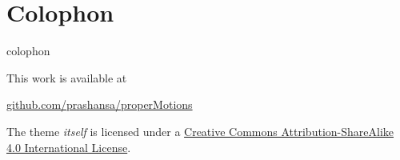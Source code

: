\documentclass[10pt, compress]{beamer}
\begin{document}






\section{Colophon}

\begin{frame}{colophon}

	This work is available at 
    
    \begin{center}\url{github.com/prashansa/properMotions}\end{center} 



  The theme \emph{itself} is licensed under a
  \href{http://creativecommons.org/licenses/by-sa/4.0/}{Creative Commons
  Attribution-ShareAlike 4.0 International License}.

  \begin{center}\ccbysa\end{center}

\end{frame}

\end{document}

